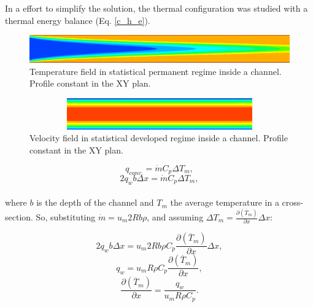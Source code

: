 \documentclass[10pt]{article} %
\begin{document}
In a effort to simplify the solution, the thermal configuration was studied with a thermal energy balance (Eq. \ref{c_h_e}).
\begin{figure}[h!]
	\centering
	\includegraphics[angle=0, scale=0.4]{fotos_formatacao_final/temperatura}
	\caption{Temperature field in statistical permanent regime inside a channel. Profile constant in the XY plan.}
	\label{figure.2}
\end{figure}
\begin{figure}[h!]
	\centering
	\includegraphics[angle=0, height=1.35cm , width=12.3cm]{fotos_formatacao_final/velocidade}
	\caption{Velocity field in statistical developed regime inside a channel. Profile constant in the XY plan.}
	\label{figure.3}
\end{figure}


\begin{equation}\label{c_h_e}
q_{conv.} = \dot{m} C_p \Delta T_m,
\end{equation}
\begin{equation}
2q_w b \Delta x = \dot{m} C_p \Delta T_m,
\end{equation}\\


{\parindent0pt where $b$ is the depth of the channel and $T_m$ the average temperature in a cross-section. So, substituting $ \dot{m} = u_m 2R b \rho $, and assuming $ \Delta T_m = \frac{\partial{\left(\overline{T}_m\right)}}{\partial{x}} \Delta x $:}

\begin{equation}
2q_w b \Delta x = u_m 2R b \rho  C_p \frac{\partial{\left(\overline{T}_m\right)}}{\partial{x}} \Delta x,
\end{equation}     
\begin{equation}
q_w = u_m R \rho  C_p \frac{\partial{\left(\overline{T}_m\right)}}{\partial{x}} ,
\end{equation} 
\begin{equation}\label{c_h_ee}
\frac{\partial{\left(\overline{T}_m\right)}}{\partial{x}} = \frac{q_w}{u_m  R \rho  C_p } .
\end{equation} 
\end{document}
